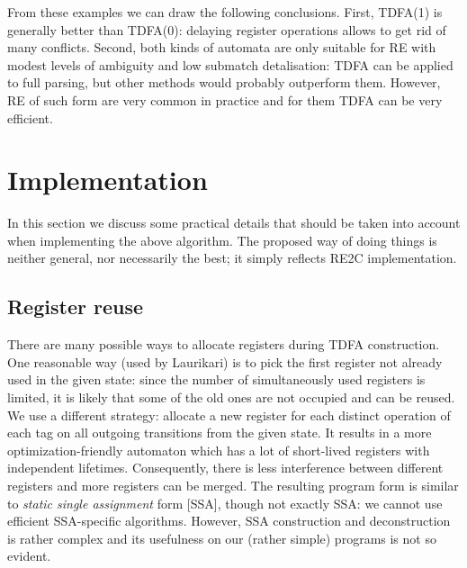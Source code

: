 \documentclass{article}
\theoremstyle{definition}
\begin{document}
\begin{multicols}{2}

From these examples we can draw the following conclusions.
First, TDFA(1) is generally better than TDFA(0): delaying register operations allows to get rid of many conflicts.
Second, both kinds of automata are only suitable for RE with modest levels of ambiguity
and low submatch detalisation: TDFA can be applied to full parsing, but other methods would probably outperform them.
However, RE of such form are very common in practice and for them TDFA can be very efficient.



\section{Implementation}\label{section_implementation}

In this section we discuss some practical details that should be taken into account when implementing the above algorithm.
The proposed way of doing things is neither general, nor necessarily the best;
it simply reflects RE2C implementation.

\subsection*{Register reuse}

There are many possible ways to allocate registers during TDFA construction.
One reasonable way (used by Laurikari) is to pick the first register not already used in the given state:
since the number of simultaneously used registers is limited,
it is likely that some of the old ones are not occupied and can be reused.
We use a different strategy: allocate a new register for each distinct operation of each tag on all outgoing transitions from the given state.
It results in a more optimization-friendly automaton
which has a lot of short-lived registers with independent lifetimes.
Consequently, there is less interference between different registers and more registers can be merged.
The resulting program form is similar to \emph{static single assignment} form [SSA],
though not exactly SSA: we cannot use efficient SSA-specific algorithms.
However, SSA construction and deconstruction is rather complex and its usefulness on our (rather simple) programs is not so evident.
\\


\end{multicols}
\end{document}

